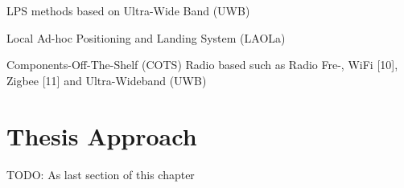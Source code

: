 

LPS methods based on Ultra-Wide Band (UWB)

Local Ad-hoc Positioning and Landing
System (LAOLa)


Components-Off-The-Shelf (COTS)
Radio based
such as Radio Fre-, WiFi [10], Zigbee [11] and
Ultra-Wideband (UWB)













\section{Thesis Approach}
TODO: As last section of this chapter

